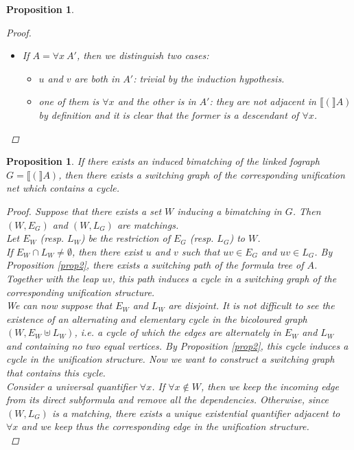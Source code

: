 \documentclass[conference,twosided,10pt]{IEEEtran}
\newtheorem{proposition}[thm]{Proposition}
\theoremstyle{definition}
\newcommand{\graphof}[1]{\llbracket#1\rrbracket}
\begin{document}
\begin{proposition}
\begin{proof}
\begin{itemize}
\begin{itemize}
    \end{itemize}
  \item If $A = \forall x \ A'$, then we distinguish two cases:
    \begin{itemize}
      \item $u$ and $v$ are both in $A'$: trivial by the induction
	      hypothesis.
      \item one of them is $\forall x$ and the other is in $A'$:
	      they are not adjacent in $\graphof(A)$ by definition and it is clear that
		    the former is a descendant of $\forall x$.
    \end{itemize}
\end{itemize}
\end{proof}
\end{proposition}

\begin{proposition}
If there exists an induced bimatching of the linked fograph $G = \graphof(A)$, then there exists a switching graph of the corresponding unification net which contains a cycle.
\begin{proof}
  Suppose that there exists a set $W$ inducing a bimatching in $G$.
  Then $(W, E_G)$ and $(W, L_G)$ are matchings.\\
  Let $E_W$ (resp. $L_W$) be the restriction of $E_G$ (resp. $L_G$) to $W$. \\
  If $E_W \cap L_W \neq \emptyset$, then there exist $u$ and $v$ such that $uv
  \in E_G$ and $uv \in L_G$. By Proposition \ref{prop2}, there exists a
  switching path of the formula tree of $A$. Together with the leap
  $uv$, this path induces a cycle in a switching graph of the
  corresponding unification structure. \\
  We can now suppose that $E_W$ and $L_W$ are disjoint. It is not difficult to
  see the existence of an alternating and elementary cycle in the bicoloured graph $(W, E_W \uplus L_W)$, i.e. a cycle of which the edges are alternately in $E_W$ and $L_W$ and containing no two equal vertices.
  By Proposition \ref{prop2}, this cycle induces a cycle in the unification
  structure. Now we want to construct a switching graph that contains this cycle.\\
  Consider a universal quantifier $\forall x$. If $\forall x \notin W$, then        
  we keep the incoming edge from its direct subformula and remove all the 
  dependencies. Otherwise, since $(W, L_G)$ is a matching, there exists a
  unique existential quantifier adjacent to $\forall x$ and we keep thus the
  corresponding edge in the unification structure. \\

\end{proof}
\end{proposition}
\end{document}
